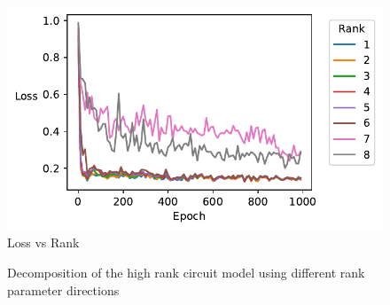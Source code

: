 \documentclass{article}
\theoremstyle{plain}
\theoremstyle{definition}
\theoremstyle{remark}
\begin{document}
\begin{figure}[ht]
    \centerline{\includegraphics{../figures/s5_high_rank_circuits_loss_vs_rank.pdf}}
    \centering
    \caption{Loss vs Rank}\label{fig:s5_high_rank_circuits_loss_vs_rank}
\end{figure}

  
\begin{figure}[ht]
    \centering
    \caption{Decomposition of the high rank circuit model using different rank parameter directions}\label{fig:s8_high_rank_circuit_decomposition_rank}
\end{figure}
\end{document}
